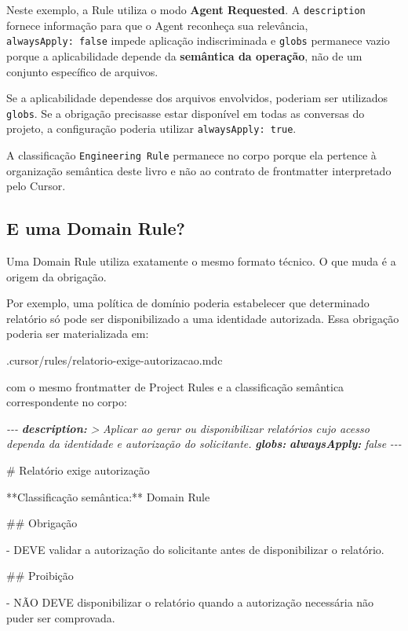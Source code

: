 \documentclass[
  10pt,
  a4paper,
  oneside]{book}
\newenvironment{Shaded}{}{}
\newcommand{\AnnotationTok}[1]{\textcolor[rgb]{0.38,0.63,0.69}{\textbf{\textit{#1}}}}
\newcommand{\CommentTok}[1]{\textcolor[rgb]{0.38,0.63,0.69}{\textit{#1}}}
\newcommand{\FunctionTok}[1]{\textcolor[rgb]{0.02,0.16,0.49}{#1}}
\newcommand{\NormalTok}[1]{#1}
\newcommand{\SpecialStringTok}[1]{\textcolor[rgb]{0.73,0.40,0.53}{#1}}
\renewenvironment{Shaded}{\begin{snugshade}}{\end{snugshade}}%
\begin{document}
Neste exemplo, a Rule utiliza o modo \textbf{Agent Requested}. A
\texttt{description} fornece informação para que o Agent reconheça sua
relevância, \texttt{alwaysApply:\ false} impede aplicação indiscriminada
e \texttt{globs} permanece vazio porque a aplicabilidade depende da
\textbf{semântica da operação}, não de um conjunto específico de
arquivos.

Se a aplicabilidade dependesse dos arquivos envolvidos, poderiam ser
utilizados \texttt{globs}. Se a obrigação precisasse estar disponível em
todas as conversas do projeto, a configuração poderia utilizar
\texttt{alwaysApply:\ true}.

A classificação \texttt{Engineering\ Rule} permanece no corpo porque ela
pertence à organização semântica deste livro e não ao contrato de
frontmatter interpretado pelo Cursor.

\hypertarget{e-uma-domain-rule}{%
\subsection{E uma Domain Rule?}\label{e-uma-domain-rule}}

Uma Domain Rule utiliza exatamente o mesmo formato técnico. O que muda é
a origem da obrigação.

Por exemplo, uma política de domínio poderia estabelecer que determinado
relatório só pode ser disponibilizado a uma identidade autorizada. Essa
obrigação poderia ser materializada em:

\begin{Shaded}
\begin{Highlighting}[]
\NormalTok{.cursor/rules/relatorio{-}exige{-}autorizacao.mdc}
\end{Highlighting}
\end{Shaded}

com o mesmo frontmatter de Project Rules e a classificação semântica
correspondente no corpo:

\begin{Shaded}
\begin{Highlighting}[]
\CommentTok{{-}{-}{-}}
\AnnotationTok{description:}\CommentTok{ \textgreater{}}
\CommentTok{  Aplicar ao gerar ou disponibilizar relatórios cujo acesso}
\CommentTok{  dependa da identidade e autorização do solicitante.}
\AnnotationTok{globs:}
\AnnotationTok{alwaysApply:}\CommentTok{ false}
\CommentTok{{-}{-}{-}}

\FunctionTok{\# Relatório exige autorização}

\NormalTok{**Classificação semântica:** Domain Rule}

\FunctionTok{\#\# Obrigação}

\SpecialStringTok{{-} }\NormalTok{DEVE validar a autorização do solicitante antes de disponibilizar o relatório.}

\FunctionTok{\#\# Proibição}

\SpecialStringTok{{-} }\NormalTok{NÃO DEVE disponibilizar o relatório quando a autorização necessária não puder ser comprovada.}
\end{Highlighting}
\end{Shaded}
\end{document}
